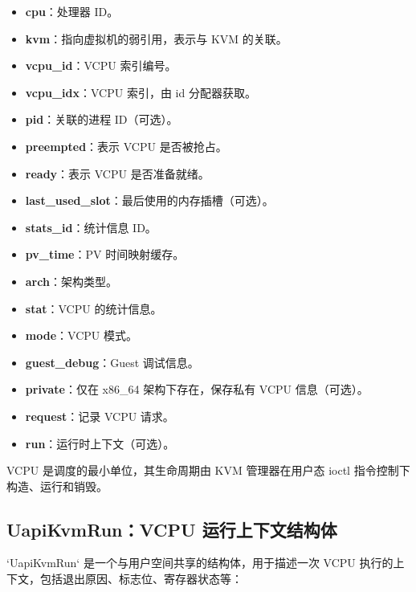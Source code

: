 \documentclass[analyze]{mancls}
\begin{document}
\begin{itemize}
    \item \textbf{cpu}：处理器 ID。
    \item \textbf{kvm}：指向虚拟机的弱引用，表示与 KVM 的关联。
    \item \textbf{vcpu\_id}：VCPU 索引编号。
    \item \textbf{vcpu\_idx}：VCPU 索引，由 id 分配器获取。
    \item \textbf{pid}：关联的进程 ID（可选）。
    \item \textbf{preempted}：表示 VCPU 是否被抢占。
    \item \textbf{ready}：表示 VCPU 是否准备就绪。
    \item \textbf{last\_used\_slot}：最后使用的内存插槽（可选）。
    \item \textbf{stats\_id}：统计信息 ID。
    \item \textbf{pv\_time}：PV 时间映射缓存。
    \item \textbf{arch}：架构类型。
    \item \textbf{stat}：VCPU 的统计信息。
    \item \textbf{mode}：VCPU 模式。
    \item \textbf{guest\_debug}：Guest 调试信息。
    \item \textbf{private}：仅在 x86\_64 架构下存在，保存私有 VCPU 信息（可选）。
    \item \textbf{request}：记录 VCPU 请求。
    \item \textbf{run}：运行时上下文（可选）。
\end{itemize}


VCPU 是调度的最小单位，其生命周期由 KVM 管理器在用户态 ioctl 指令控制下构造、运行和销毁。

\subsection{UapiKvmRun：VCPU 运行上下文结构体}
`UapiKvmRun` 是一个与用户空间共享的结构体，用于描述一次 VCPU 执行的上下文，包括退出原因、标志位、寄存器状态等：
\end{document}
